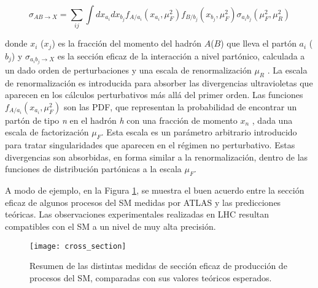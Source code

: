 \begin{equation}
\sigma_{AB\rightarrow X}=\sum_{ij}\int dx_{a_{i}}dx_{b_{j}}f_{A/a_{i}}(x_{a_{i}},\mu_{F}^{2})f_{B/b_{j}}(x_{b_{j}},\mu_{F}^{2})\sigma_{a_{i}b_{j}}(\mu_{F}^{2},\mu_{R}^{2})
\end{equation}

donde $x_{i}$ ($x_{j}$) es la fracción del momento del hadrón $A$($B$) que lleva el partón $a_{i}$ ($b_{j}$) y $\sigma_{a_{i}b_{j}\rightarrow X}$ es la sección eficaz de la interacción a nivel partónico, calculada a un dado orden de perturbaciones y una escala de renormalización $\mu_R$ . La escala de renormalización es introducida para absorber las divergencias ultravioletas que aparecen en los cálculos perturbativos más allá del primer orden. Las funciones $f_{A/a_{i}}(x_{a_{i}},\mu_{F}^{2})$ son las PDF, que representan la probabilidad de encontrar un partón de tipo \textit{n} en el hadrón \textit{h} con una fracción de momento $x_{n}$ , dada una escala de factorización $\mu_{F}$. Esta escala es un parámetro arbitrario introducido para tratar singularidades que aparecen en el régimen no perturbativo. Estas divergencias son absorbidas, en forma similar a la renormalización, dentro de las funciones de distribución partónicas a la escala $\mu_{F}$. 


A modo de ejemplo, en la Figura \ref{cross_section}, se muestra el buen acuerdo entre la sección eficaz de algunos procesos del SM medidas por ATLAS y las predicciones teóricas. Las observaciones experimentales realizadas en LHC resultan compatibles con el SM a un nivel de muy alta precisión.


\begin{figure}[ht]
\centering
\texttt{[image: cross\_section]}
\caption{Resumen de las distintas medidas de sección eficaz de producción de procesos del SM, comparadas con sus valores teóricos esperados.}
\label{cross_section}
\end{figure}
